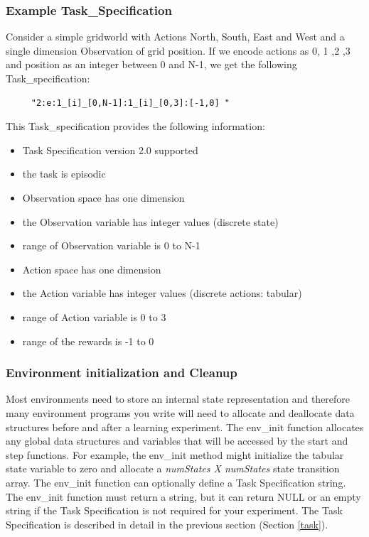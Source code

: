 \documentclass[11pt]{article}
\begin{document}
\subsubsection{Example Task\_Specification}
Consider a simple gridworld with Actions North, South, East and West and a single dimension Observation of grid position. If we encode actions as 0, 1 ,2 ,3 and position as an integer between 0 and N-1, we get the following Task\_specification:
\begin{verbatim}
     "2:e:1_[i]_[0,N-1]:1_[i]_[0,3]:[-1,0] "
\end{verbatim}
This Task\_specification provides the following information:
\begin{itemize}

\item Task Specification version 2.0 supported
\item the task is episodic
\item Observation space has one dimension
\item the Observation variable has integer values (discrete state)
\item range of Observation variable is 0 to N-1
\item Action space has one dimension
\item the Action variable has integer values (discrete actions: tabular)
\item range of Action variable is 0 to 3
\item range of the rewards is -1 to 0
\end{itemize}



        
\subsubsection{Environment initialization and Cleanup}        
Most environments need to store an internal state representation  and therefore many environment programs you write will need to allocate and deallocate data structures before and after a learning experiment. The env\_init function allocates any global data structures and variables that will be accessed by the start and step functions. For example, the env\_init method might initialize the tabular state variable to zero and allocate a {\it numStates X numStates} state transition array. The env\_init function can optionally define a Task Specification string. The env\_init function must return a string, but it can return NULL or an empty string if the Task Specification is not required for your experiment. The Task Specification is described in detail in the previous section (Section \ref{task}).
\end{document}
